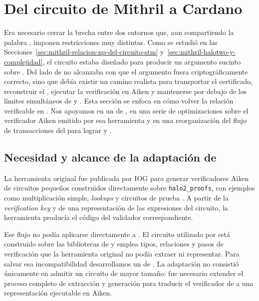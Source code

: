 
\section{Del circuito \texorpdfstring{\HaloTwo}{HaloTwo} de Mithril a Cardano}
\label{sec:mithril-a-cardano-del-circuito-halotwo-de-mithril-a-cardano}

Era necesario cerrar la brecha entre dos entornos que, aun compartiendo la palabra \HaloTwo, imponen restricciones muy distintas. Como se estudió en las Secciones~\ref{sec:mithril-relacion-np-del-circuito-stm} y~\ref{sec:mithril-halotwo-y-complejidad}, el circuito \MidnightSTMCircuit estaba diseñado para producir un argumento sucinto sobre \BLS. Del lado de \Cardano no alcanzaba con que el argumento fuera criptográficamente correcto, sino que debía existir un camino realista para transportar el certificado, reconstruir el \transcript, ejecutar la verificación en Aiken y mantenerse por debajo de los límites simultáneos de \maxTxExUnits y \maxTxSize. Esta sección se enfoca en cómo volver la relación \STMRelation verificable \Onchain en \Cardano. Nos apoyamos en un \fork de \PlutusHaloTwoVerifierGen, en una serie de optimizaciones sobre el verificador Aiken emitido por esa herramienta y en una reorganización del flujo de transacciones del \zkBridge para lograr \StakeDistTx y \MintTx.

\subsection{Necesidad y alcance de la adaptación de \PlutusHaloTwoVerifierGen}
\label{subsec:mithril-a-cardano-necesidad-y-alcance-de-la-adaptacion-de-plutushalotwoverifiergen}

La herramienta original \PlutusHaloTwoVerifierGen fue publicada por IOG para generar verificadores Aiken de circuitos pequeños construidos directamente sobre \texttt{halo2\_proofs}, con ejemplos como multiplicación simple, \textit{lookups} y circuitos de prueba \cite{PlutusHalo2VerifierGenRepo, IOGHalo2PlutusVerifier}. A partir de la \textit{verification key} y de una representación de las expresiones del circuito, la herramienta producía el código del validador correspondiente.

Ese flujo no podía aplicarse directamente a \MidnightSTMCircuit. El circuito utilizado por \Mithril está construido sobre las bibliotecas de \Midnight y emplea tipos, relaciones y pasos de verificación que la herramienta original no podía extraer ni representar. Para salvar esa incompatibilidad desarrollamos un \fork de \PlutusHaloTwoVerifierGen. La adaptación no consistió únicamente en admitir un circuito de mayor tamaño: fue necesario extender el proceso completo de extracción y generación para traducir el verificador de \Midnight a una representación ejecutable en Aiken.

